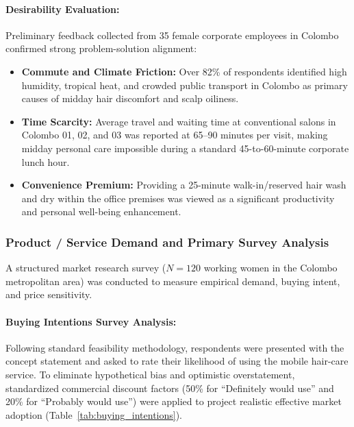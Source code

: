 \paragraph{Desirability Evaluation:}
Preliminary feedback collected from 35 female corporate employees in Colombo confirmed strong problem-solution alignment:
\begin{itemize}[leftmargin=1.5em, itemsep=0.15em]
    \item \textbf{Commute and Climate Friction:} Over 82\% of respondents identified high humidity, tropical heat, and crowded public transport in Colombo as primary causes of midday hair discomfort and scalp oiliness.
    \item \textbf{Time Scarcity:} Average travel and waiting time at conventional salons in Colombo 01, 02, and 03 was reported at 65--90 minutes per visit, making midday personal care impossible during a standard 45-to-60-minute corporate lunch hour.
    \item \textbf{Convenience Premium:} Providing a 25-minute walk-in/reserved hair wash and dry within the office premises was viewed as a significant productivity and personal well-being enhancement.
\end{itemize}

\subsubsection{Product / Service Demand and Primary Survey Analysis}
A structured market research survey ($N = 120$ working women in the Colombo metropolitan area) was conducted to measure empirical demand, buying intent, and price sensitivity.

\paragraph{Buying Intentions Survey Analysis:}
Following standard feasibility methodology, respondents were presented with the concept statement and asked to rate their likelihood of using the mobile hair-care service. To eliminate hypothetical bias and optimistic overstatement, standardized commercial discount factors (50\% for ``Definitely would use'' and 20\% for ``Probably would use'') were applied to project realistic effective market adoption (Table~\ref{tab:buying_intentions}).

